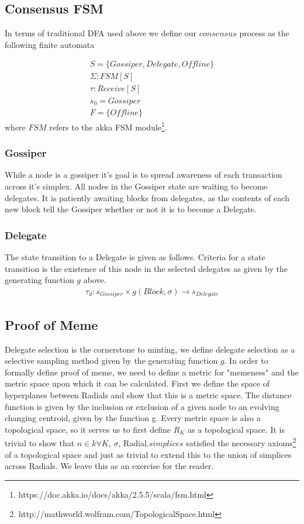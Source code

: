 \documentclass{article}
\begin{document}
\subsection{Consensus FSM}
In terms of traditional DFA used above we define our $consensus$ process as the following finite automata

\begin{equation} \label{eq1}
\begin{split}
S = \{Gossiper, Delegate, Offline\} \\
\Sigma: FSM[S] \\
\tau: Receive[S] \\
s_0 = Gossiper \\
F = \{Offline\}
\end{split}
\end{equation}
where $FSM$ refers to the akka FSM module\footnote{https://doc.akka.io/docs/akka/2.5.5/scala/fsm.html}.
\subsubsection{Gossiper}
While a node is a gossiper it's goal is to spread awareness of each transaction across it's simplex. All nodes in the Gossiper state are waiting to become delegates. It is patiently awaiting blocks from delegates, as the contents of each new block tell the Gossiper whether or not it is to become a Delegate.
\subsubsection{Delegate}
The state transition to a Delegate is given as follows. Criteria for a state transition is the existence of this node in the selected delegates as given by the generating function $g$ above.
\begin{equation} \label{eq1}
\begin{split}
\tau_d: s_{Gossiper} \times g(Block, \sigma) \rightarrow s_{Delegate}
\end{split}
\end{equation}

\subsection{Proof of Meme}
Delegate selection is the cornerstone to minting, we define delegate selection as a selective sampling method given by the generating function $g$. In order to formally define proof of meme, we need to define a metric for "memeness" and the metric space upon which it can be calculated. First we define the space of hyperplanes between Radials and show that this is a metric space. The distance function is given by the inclusion or exclusion of a given node to an evolving changing centroid, given by the function g. Every metric space is also a topological space, so it serves us to first define $R_K$ as a topological space. It is trivial to show that $n \in k \forall K$, $\sigma$, Radial.$simplices$ satisfied the necessary axioms\footnote{http://mathworld.wolfram.com/TopologicalSpace.html} of a topological space and just as trivial to extend this to the union of simplices across Radials. We leave this as an exercise for the reader. 
\end{document}
